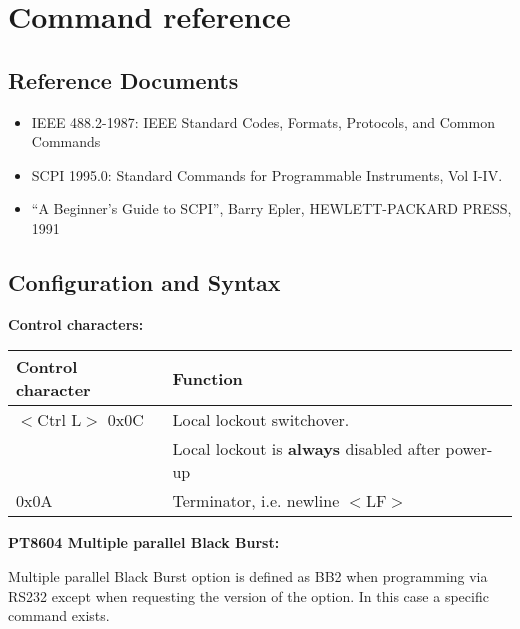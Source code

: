 \section{Command reference}
\label{cha:CommandRef}
\subsection{Reference Documents}

\begin{itemize}
\item IEEE 488.2-1987: IEEE Standard Codes, Formats, Protocols, and Common Commands
\item SCPI 1995.0: Standard Commands for Programmable Instruments, Vol I-IV.
\item ``A Beginner's Guide to SCPI'', Barry Epler, HEWLETT-PACKARD PRESS, 1991
\end{itemize}

\subsection{Configuration and Syntax}

\textbf{Control characters:}

\begin{tabular}{|l|l|}
\hline
Control character 	& Function \\ \hline
$<$Ctrl L$>$ 0x0C 	& Local lockout switchover. \\ 
										& Local lockout is \textbf{always} disabled after power-up \\ \hline
0x0A	 							& Terminator, i.e. newline $<$LF$>$ \\ \hline
\end{tabular}

\textbf{PT8604 Multiple parallel Black Burst:}


Multiple parallel Black Burst option is defined as BB2 when programming via RS232 except when requesting the version of the option. In this case a specific command exists.

